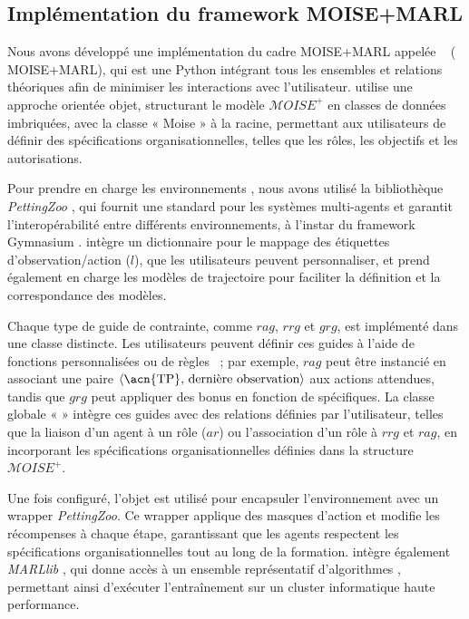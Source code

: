\subsection{Implémentation du framework MOISE+MARL}

Nous avons développé une implémentation du cadre MOISE+MARL appelée ~\hyperref[fn:github]{\footnotemark[2]} ( MOISE+MARL), qui est une  Python intégrant tous les ensembles et relations théoriques afin de minimiser les interactions avec l'utilisateur.  utilise une approche orientée objet, structurant le modèle $\mathcal{M}OISE^+$ en classes de données imbriquées, avec la classe « Moise » à la racine, permettant aux utilisateurs de définir des spécifications organisationnelles, telles que les rôles, les objectifs et les autorisations.


Pour prendre en charge les environnements , nous avons utilisé la bibliothèque \textit{PettingZoo} \cite{terry2020pettingzoo}, qui fournit une  standard pour les systèmes multi-agents et garantit l'interopérabilité entre différents environnements, à l'instar du framework Gymnasium \cite{kwiatkowski2024}.  intègre un dictionnaire pour le mappage des étiquettes d'observation/action ($l$), que les utilisateurs peuvent personnaliser, et prend également en charge les modèles de trajectoire  pour faciliter la définition et la correspondance des modèles.

Chaque type de guide de contrainte, comme $rag$, $rrg$ et $grg$, est implémenté dans une classe distincte. Les utilisateurs peuvent définir ces guides à l'aide de fonctions personnalisées ou de règles ~; par exemple, $rag$ peut être instancié en associant une paire $\langle \text{\acn{TP}, dernière observation} \rangle$ aux actions attendues, tandis que $grg$ peut appliquer des bonus en fonction de  spécifiques. La classe globale «  » intègre ces guides avec des relations définies par l'utilisateur, telles que la liaison d'un agent à un rôle ($ar$) ou l'association d'un rôle à $rrg$ et $rag$, en incorporant les spécifications organisationnelles définies dans la structure $\mathcal{M}OISE^+$.

Une fois configuré, l'objet  est utilisé pour encapsuler l'environnement avec un wrapper \textit{PettingZoo}. Ce wrapper applique des masques d'action et modifie les récompenses à chaque étape, garantissant que les agents respectent les spécifications organisationnelles tout au long de la formation.  intègre également \textit{MARLlib} \cite{hu2021marlib}, qui donne accès à un ensemble représentatif d'algorithmes , permettant ainsi d'exécuter l'entraînement sur un cluster informatique haute performance.

